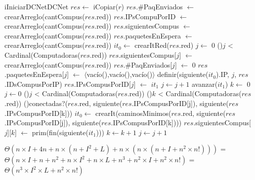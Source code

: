 \begin{Algoritmos}

  \begin{algoritmo}{iIniciarDCNet}{}{DCNet}
    $res \gets$ iCopiar($r$)   
    $res$.\#PaqEnviados $\gets$ crearArreglo(cantCompus($res$.red))   
    $res$.IPsCompuPorID $\gets$ crearArreglo(cantCompus($res$.red))   
    $res$.siguientesCompus $\gets$ crearArreglo(cantCompus($res$.red))   
    $res$.paquetesEnEspera $\gets$ crearArreglo(cantCompus($res$.red))   
     $it_{0} \gets$ crearItRed($res$.red)   
     $j \gets$ 0   
    \While(){$j$ < Cardinal(Computadoras($res$.red))}{
      $res$.siguientesCompus[$j$] $\gets$ crearArreglo(cantCompus($res$.red))   
      $res$.\#PaqEnviados[$j$] $\gets$ 0   
      $res$.paquetesEnEspera[$j$] $\gets$ $\langle$vac\'{i}o(),vac\'{i}o(),vac\'{i}o()$\rangle$   
      definir(siguiente($it_{0}$).IP, $j$, $res$.IDsCompusPorIP)   
      $res$.IPsCompusPorID[$j$] $\gets$ $it_{1}$   
      $j \gets j + 1$   
      avanzar($it_{1}$)   
    }
     $k \gets$ 0   
    $j \gets 0$   
    \While(){$j$ < Cardinal(Computadoras($res$.red))}{
      \While(){$k$ < Cardinal(Computadoras($res$.red))}{
        \If(){conectadas?($res$.red, siguiente($res$.IPsCompusPorID[j]), siguiente($res$.IPsCompusPorID[k]))}{
           $it_{0} \gets$ crearIt(caminosMinimos($res$.red, siguiente($res$.IPsCompusPorID[j]), siguiente($res$.IPsCompusPorID[k])))\;
          $res$.siguientesCompus[$j$][$k$] $\gets$ prim(fin(siguiente($it_{1}$)))   
        }
        $k \gets k + 1$  
      }
      $j \gets j + 1$  
    }
  \end{algoritmo}
 \datosAlgoritmo{} %
  {} %
  {} %
  {$\Theta(n \times I + 4 n + n \times (n + I^2 + L) + n \times (n \times (n + I + n^2 \times n!)))$ = $\Theta(n \times I + n + n^2+ n \times I^2 + n \times L + n^3 + n^2 \times I + n^2 \times n!)$ = $\Theta(n^3 \times I^2 \times L + n^2 \times n!)$} %
  {} %


\end{Algoritmos}
